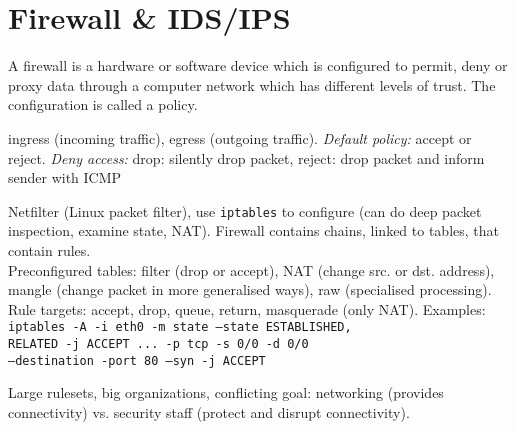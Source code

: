 \section{Firewall \& IDS/IPS}

 A firewall is a hardware or software device which is configured to permit, deny or proxy data through a computer network which has different levels of trust. The configuration is called a policy.

 ingress (incoming traffic), egress (outgoing traffic). \textit{Default policy:} accept or reject. \textit{Deny access:} drop: silently drop packet, reject: drop packet and inform sender with ICMP

 Netfilter (Linux packet filter), use {\tt iptables} to configure (can do deep packet inspection, examine state, NAT). Firewall contains chains, linked to tables, that contain rules. \\
Preconfigured tables: filter (drop or accept), NAT (change src. or dst. address), mangle (change packet in more generalised ways), raw (specialised processing).\\
Rule targets: accept, drop, queue, return, masquerade (only NAT). Examples: \\
{\tt iptables -A -i eth0 -m state --state ESTABLISHED,}\\
{\tt RELATED -j ACCEPT ... -p tcp -s 0/0 -d 0/0}\\
{\tt --destination -port 80 --syn -j ACCEPT}

 Large rulesets, big organizations, conflicting goal: networking (provides connectivity) vs. security staff (protect and disrupt connectivity).


